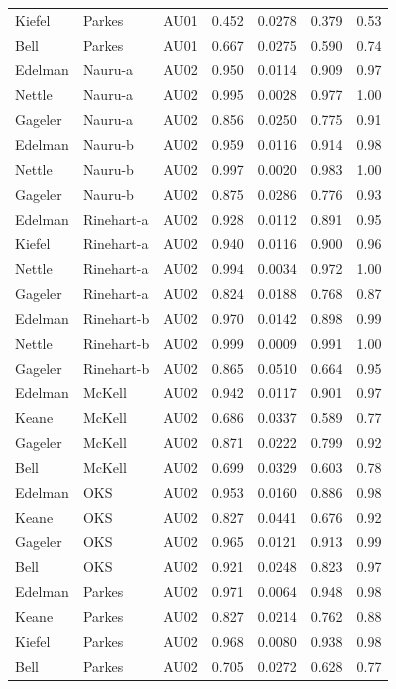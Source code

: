 \documentclass{monashthesis}
\begin{document}
\begin{center}
\begin{longtable}{lllllll}
Kiefel & Parkes & AU01 & 0.452 & 0.0278 & 0.379 & 0.53 \\
Bell & Parkes & AU01 & 0.667 & 0.0275 & 0.590 & 0.74 \\
Edelman & Nauru-a & AU02 & 0.950 & 0.0114 & 0.909 & 0.97 \\
Nettle & Nauru-a & AU02 & 0.995 & 0.0028 & 0.977 & 1.00 \\
Gageler & Nauru-a & AU02 & 0.856 & 0.0250 & 0.775 & 0.91 \\
Edelman & Nauru-b & AU02 & 0.959 & 0.0116 & 0.914 & 0.98 \\
Nettle & Nauru-b & AU02 & 0.997 & 0.0020 & 0.983 & 1.00 \\
Gageler & Nauru-b & AU02 & 0.875 & 0.0286 & 0.776 & 0.93 \\
Edelman & Rinehart-a & AU02 & 0.928 & 0.0112 & 0.891 & 0.95 \\
Kiefel & Rinehart-a & AU02 & 0.940 & 0.0116 & 0.900 & 0.96 \\
Nettle & Rinehart-a & AU02 & 0.994 & 0.0034 & 0.972 & 1.00 \\
Gageler & Rinehart-a & AU02 & 0.824 & 0.0188 & 0.768 & 0.87 \\
Edelman & Rinehart-b & AU02 & 0.970 & 0.0142 & 0.898 & 0.99 \\
Nettle & Rinehart-b & AU02 & 0.999 & 0.0009 & 0.991 & 1.00 \\
Gageler & Rinehart-b & AU02 & 0.865 & 0.0510 & 0.664 & 0.95 \\
Edelman & McKell & AU02 & 0.942 & 0.0117 & 0.901 & 0.97 \\
Keane & McKell & AU02 & 0.686 & 0.0337 & 0.589 & 0.77 \\
Gageler & McKell & AU02 & 0.871 & 0.0222 & 0.799 & 0.92 \\
Bell & McKell & AU02 & 0.699 & 0.0329 & 0.603 & 0.78 \\
Edelman & OKS & AU02 & 0.953 & 0.0160 & 0.886 & 0.98 \\
Keane & OKS & AU02 & 0.827 & 0.0441 & 0.676 & 0.92 \\
Gageler & OKS & AU02 & 0.965 & 0.0121 & 0.913 & 0.99 \\
Bell & OKS & AU02 & 0.921 & 0.0248 & 0.823 & 0.97 \\
Edelman & Parkes & AU02 & 0.971 & 0.0064 & 0.948 & 0.98 \\
Keane & Parkes & AU02 & 0.827 & 0.0214 & 0.762 & 0.88 \\
Kiefel & Parkes & AU02 & 0.968 & 0.0080 & 0.938 & 0.98 \\
Bell & Parkes & AU02 & 0.705 & 0.0272 & 0.628 & 0.77 \\

\end{longtable}
\end{center}
\end{document}
